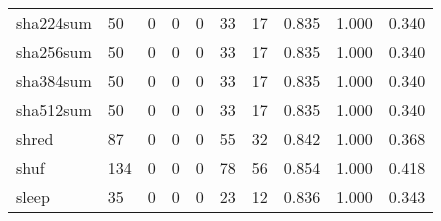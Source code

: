 \begin{longtable}{lp{2.0cm}p{2.0cm}p{2.0cm}p{2.0cm}p{2.0cm}p{2.0cm}p{2.0cm}p{2.0cm}p{2.0cm}}
sha224sum &                     50 &                                             0 &                                            0 &                                           0 &                                           33 &                                         17 &                                0.835 &                                  1.000 &                                0.340 \\
sha256sum &                     50 &                                             0 &                                            0 &                                           0 &                                           33 &                                         17 &                                0.835 &                                  1.000 &                                0.340 \\
sha384sum &                     50 &                                             0 &                                            0 &                                           0 &                                           33 &                                         17 &                                0.835 &                                  1.000 &                                0.340 \\
sha512sum &                     50 &                                             0 &                                            0 &                                           0 &                                           33 &                                         17 &                                0.835 &                                  1.000 &                                0.340 \\
shred     &                     87 &                                             0 &                                            0 &                                           0 &                                           55 &                                         32 &                                0.842 &                                  1.000 &                                0.368 \\
shuf      &                    134 &                                             0 &                                            0 &                                           0 &                                           78 &                                         56 &                                0.854 &                                  1.000 &                                0.418 \\
sleep     &                     35 &                                             0 &                                            0 &                                           0 &                                           23 &                                         12 &                                0.836 &                                  1.000 &                                0.343 \\

\end{longtable}
